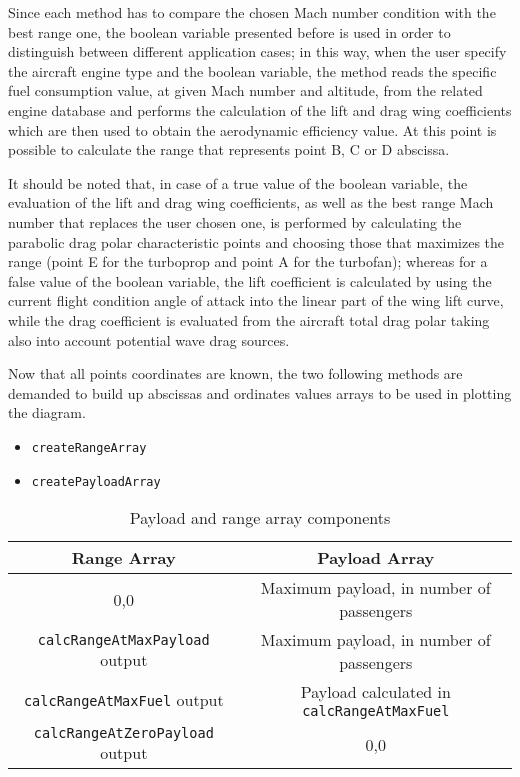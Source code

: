 \bigskip
Since each method has to compare the chosen Mach number condition with the best range one, the boolean variable presented before is used in order to distinguish between different application cases; in this way, when the user specify the aircraft engine type and the boolean variable, the method reads the specific fuel consumption value, at given Mach number and altitude, from the related engine database and performs the calculation of the lift and drag wing coefficients which are then used to obtain the aerodynamic efficiency value. At this point is possible to calculate the range that represents point B, C or D abscissa. 

It should be noted that, in case of a true value of the boolean variable, the evaluation of the lift and drag wing coefficients, as well as the best range Mach number that replaces the user chosen one, is performed by calculating the parabolic drag polar characteristic points and choosing those that maximizes the range (point E for the turboprop and point A for the turbofan); whereas for a false value of the boolean variable, the lift coefficient is calculated by using the current flight condition angle of attack into the linear part of the wing lift curve, while the drag coefficient is evaluated from the aircraft total drag polar taking also into account potential wave drag sources.   

\bigskip
Now that all points coordinates are known, the two following methods are demanded to build up abscissas and ordinates values arrays to be used in plotting the diagram.

\begin{itemize}
\item\lstinline[language=Java]!createRangeArray!
\item\lstinline[language=Java]!createPayloadArray!
\end{itemize}

\begin{table}[!ht]
\centering
\begin{tabular}{cc}
\toprule
\textbf{Range Array} & \textbf{Payload Array} \\ 
\midrule
0,0	& Maximum payload, in number of passengers \\ [0.2cm]
\lstinline[language=Java]!calcRangeAtMaxPayload! output &	Maximum payload, in number of passengers \\ [0.2cm]
\lstinline[language=Java]!calcRangeAtMaxFuel! output &	Payload calculated in \lstinline[language=Java]!calcRangeAtMaxFuel! \\ [0.2cm]
\lstinline[language=Java]!calcRangeAtZeroPayload! output &	0,0 \\ [0.2cm]
\bottomrule
\end{tabular}
\caption{Payload and range array components}
\label{table:Table3}
\end{table}

